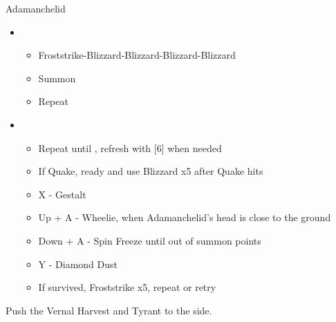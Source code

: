 \begin{battle}{Adamanchelid}
\begin{itemize}
    \item \sixth
    \begin{itemize}
        \item Froststrike-Blizzard-Blizzard-Blizzard-Blizzard
        \item Summon
        \item Repeat
    \end{itemize}
    \item \fifth
    \begin{itemize}
        \item Repeat until \stagger, refresh with [6] when needed
        \item If Quake, ready and use Blizzard x5 after Quake hits
        \item X - Gestalt
        \item Up + A - Wheelie, when Adamanchelid's head is close to the ground
        \item Down + A - Spin Freeze until out of summon points
        \item Y - Diamond Dust
        \item If survived, Froststrike x5, repeat or retry
    \end{itemize}
\end{itemize}
\end{battle}

Push the Vernal Harvest and Tyrant to the side.




